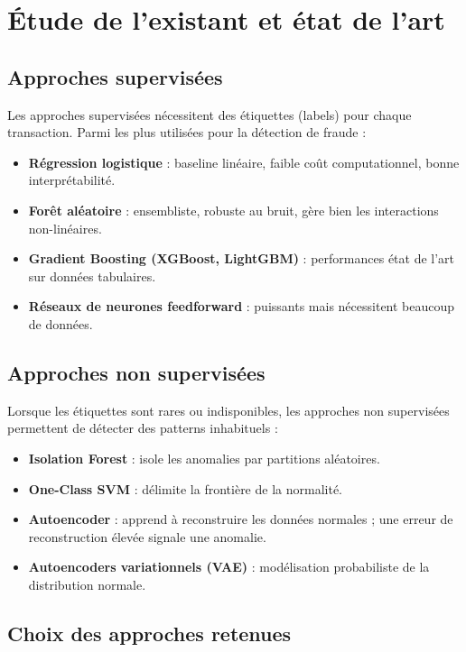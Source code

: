 \documentclass[12pt,a4paper,twoside]{report}
\begin{document}
\section{Étude de l'existant et état de l'art}

\subsection{Approches supervisées}

Les approches supervisées nécessitent des étiquettes (labels) pour chaque transaction. Parmi les plus utilisées pour la détection de fraude :

\begin{itemize}
  \item \textbf{Régression logistique} : baseline linéaire, faible coût computationnel, bonne interprétabilité.
  \item \textbf{Forêt aléatoire} : ensembliste, robuste au bruit, gère bien les interactions non-linéaires.
  \item \textbf{Gradient Boosting (XGBoost, LightGBM)} : performances état de l'art sur données tabulaires.
  \item \textbf{Réseaux de neurones feedforward} : puissants mais nécessitent beaucoup de données.
\end{itemize}

\subsection{Approches non supervisées}

Lorsque les étiquettes sont rares ou indisponibles, les approches non supervisées permettent de détecter des patterns inhabituels :

\begin{itemize}
  \item \textbf{Isolation Forest} : isole les anomalies par partitions aléatoires.
  \item \textbf{One-Class SVM} : délimite la frontière de la normalité.
  \item \textbf{Autoencoder} : apprend à reconstruire les données normales ; une erreur de reconstruction élevée signale une anomalie.
  \item \textbf{Autoencoders variationnels (VAE)} : modélisation probabiliste de la distribution normale.
\end{itemize}

\subsection{Choix des approches retenues}
\end{document}
